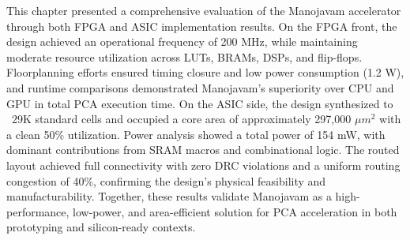 This chapter presented a comprehensive evaluation of the Manojavam accelerator through both FPGA and ASIC implementation results. On the FPGA front, the design achieved an operational frequency of 200 MHz, while maintaining moderate resource utilization across LUTs, BRAMs, DSPs, and flip-flops. Floorplanning efforts ensured timing closure and low power consumption (1.2 W), and runtime comparisons demonstrated Manojavam’s superiority over CPU and GPU in total PCA execution time. On the ASIC side, the design synthesized to ~29K standard cells and occupied a core area of approximately 297,000 $\mu m^{2}$ with a clean 50\% utilization. Power analysis showed a total power of 154 mW, with dominant contributions from SRAM macros and combinational logic. The routed layout achieved full connectivity with zero DRC violations and a uniform routing congestion of 40\%, confirming the design’s physical feasibility and manufacturability. Together, these results validate Manojavam as a high-performance, low-power, and area-efficient solution for PCA acceleration in both prototyping and silicon-ready contexts.



